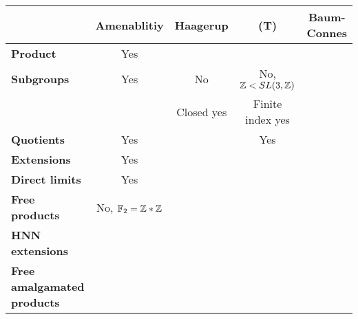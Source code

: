 \begin{table}[h]
\begin{tabular}{c|c|c|c|c|}
\cline{2-5}
                                                         & \textbf{Amenablitiy} & \textbf{Haagerup} & \textbf{(T)}            & \textbf{Baum-Connes}  \\ \hline
\multicolumn{1}{|l|}{\textbf{Product}}                   &            Yes          &                   &                      &                       \\ \hline
\multicolumn{1}{|l|}{\textbf{Subgroups}}                 &            Yes          &       No          & No, $\mathbb Z < SL(3,\mathbb Z)$   &                       \\ 
\multicolumn{1}{|l|}{}                                   &                         &   Closed yes      & Finite index yes   &                       \\ \hline
\multicolumn{1}{|l|}{\textbf{Quotients}}                 &            Yes          &                   &         Yes          &                       \\ \hline
\multicolumn{1}{|l|}{\textbf{Extensions}}                &            Yes          &                   &                      &                       \\ \hline
\multicolumn{1}{|l|}{\textbf{Direct limits}}             &            Yes          &                   &                      &                       \\ \hline
\multicolumn{1}{|l|}{\textbf{Free products}}             &No, $\mathbb F_2 = \mathbb Z \ast \mathbb Z$   &           &                      &                       \\ \hline
\multicolumn{1}{|l|}{\textbf{HNN extensions}}            &                      &                      &                      &                       \\ \hline
\multicolumn{1}{|l|}{\textbf{Free amalgamated products}} &                      &                      &                      &                       \\ \hline
\end{tabular}
\end{table}

